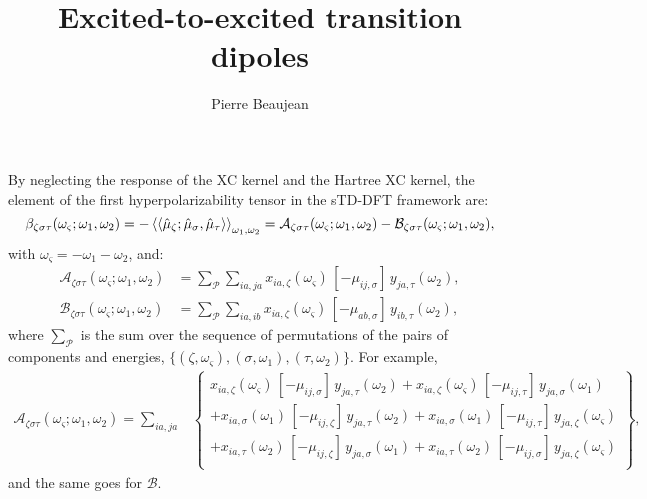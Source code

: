 \documentclass[11pt,a4paper]{article}
\title{Excited-to-excited transition dipoles}
\author{Pierre Beaujean}
\begin{document}
\maketitle

By neglecting the response of the XC kernel and the Hartree XC kernel, the element of the first hyperpolarizability tensor in the sTD-DFT framework are: \cite{deWergifosse2018NLObeta}
\begin{equation}
\beta_{\zeta\sigma\tau}(\omega_\varsigma;\omega_1,\omega_2) = -\braket{\braket{\hat\mu_\zeta;\hat\mu_\sigma,\hat\mu_\tau}}_{\omega_1,\omega_2} = \mathcal A_{\zeta\sigma\tau}(\omega_\varsigma;\omega_1,\omega_2) - \mathcal B_{\zeta\sigma\tau}(\omega_\varsigma;\omega_1,\omega_2), \label{eq:beta}
\end{equation}
with $\omega_\varsigma = -\omega_1 - \omega_2$, and:
\begin{align}
	\mathcal A_{\zeta\sigma\tau}(\omega_\varsigma;\omega_1,\omega_2) &= \sum_{\mathcal P} \sum_{ia,ja} x_{ia,\zeta}(\omega_\varsigma)\,[-\mu_{ij,\sigma}]\,y_{ja,\tau}(\omega_2), \label{eq:A}\\
	\mathcal B_{\zeta\sigma\tau}(\omega_\varsigma;\omega_1,\omega_2) &= \sum_{\mathcal P} \sum_{ia,ib} x_{ia,\zeta}(\omega_\varsigma)\,[-\mu_{ab,\sigma}]\,y_{ib,\tau}(\omega_2), \label{eq:B}
\end{align}
where $\sum_{\mathcal P}$ is the sum over the sequence of permutations of the pairs of components and energies, $\{(\zeta,\omega_\varsigma), (\sigma, \omega_1), (\tau,\omega_2)\}$. For example,
	\begin{align*}
	\mathcal A_{\zeta\sigma\tau}(\omega_\varsigma;\omega_1,\omega_2) = \sum_{ia,ja}& \left\{\begin{array}{l}
		x_{ia,\zeta}(\omega_\varsigma)\,[-\mu_{ij,\sigma}]\,y_{ja,\tau}(\omega_2) + x_{ia,\zeta}(\omega_\varsigma)\,[-\mu_{ij,\tau}]\,y_{ja,\sigma}(\omega_1)\\
		+x_{ia,\sigma}(\omega_1)\,[-\mu_{ij,\zeta}]\,y_{ja,\tau}(\omega_2) + x_{ia,\sigma}(\omega_1)\,[-\mu_{ij,\tau}]\,y_{ja,\zeta}(\omega_\varsigma) \\
		+x_{ia,\tau}(\omega_2)\,[-\mu_{ij,\zeta}]\,y_{ja,\sigma}(\omega_1) + x_{ia,\tau}(\omega_2)\,[-\mu_{ij,\sigma}]\,y_{ja,\zeta}(\omega_\varsigma)\\
	\end{array}\right\},
\end{align*}
and the same goes for $\mathcal B$.
\end{document}
